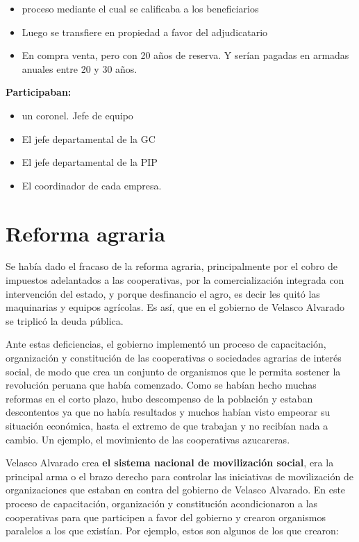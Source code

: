 \documentclass[
  a4paper,
]{article}
\providecommand{\tightlist}{%
  \setlength{\itemsep}{0pt}\setlength{\parskip}{0pt}}\usepackage{longtable,booktabs,array}
\begin{document}
\begin{itemize}
\tightlist
\item
  proceso mediante el cual se calificaba a los beneficiarios
\item
  Luego se transfiere en propiedad a favor del adjudicatario
\item
  En compra venta, pero con 20 años de reserva. Y serían pagadas en
  armadas anuales entre 20 y 30 años.
\end{itemize}

\textbf{Participaban:}

\begin{itemize}
\tightlist
\item
  un coronel. Jefe de equipo
\item
  El jefe departamental de la GC
\item
  El jefe departamental de la PIP
\item
  El coordinador de cada empresa.
\end{itemize}

\hypertarget{reforma-agraria}{%
\section{Reforma agraria}\label{reforma-agraria}}

Se había dado el fracaso de la reforma agraria, principalmente por el
cobro de impuestos adelantados a las cooperativas, por la
comercialización integrada con intervención del estado, y porque
desfinancio el agro, es decir les quitó las maquinarias y equipos
agrícolas. Es así, que en el gobierno de Velasco Alvarado se triplicó la
deuda pública.

Ante estas deficiencias, el gobierno implementó un proceso de
capacitación, organización y constitución de las cooperativas o
sociedades agrarias de interés social, de modo que crea un conjunto de
organismos que le permita sostener la revolución peruana que había
comenzado. Como se habían hecho muchas reformas en el corto plazo, hubo
descompenso de la población y estaban descontentos ya que no había
resultados y muchos habían visto empeorar su situación económica, hasta
el extremo de que trabajan y no recibían nada a cambio. Un ejemplo, el
movimiento de las cooperativas azucareras.

Velasco Alvarado crea \textbf{el sistema nacional de movilización
social}, era la principal arma o el brazo derecho para controlar las
iniciativas de movilización de organizaciones que estaban en contra del
gobierno de Velasco Alvarado. En este proceso de capacitación,
organización y constitución acondicionaron a las cooperativas para que
participen a favor del gobierno y crearon organismos paralelos a los que
existían. Por ejemplo, estos son algunos de los que crearon:
\end{document}
